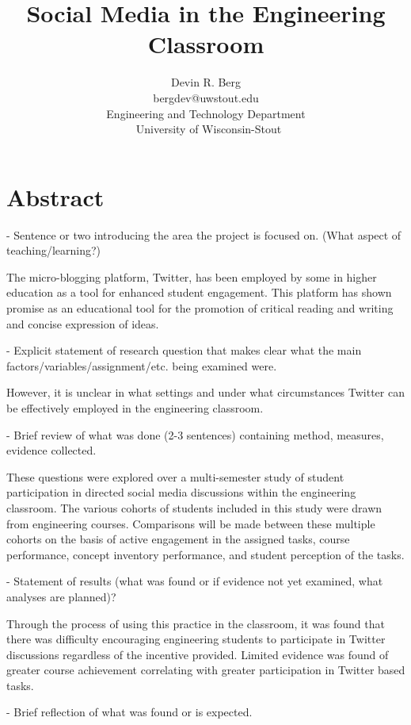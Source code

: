\documentclass[12pt]{article}
\title{\large \textbf{Social Media in the Engineering Classroom}} %
\author{\vspace{-5ex}}
\author{\normalsize Devin R. Berg\\
\normalsize bergdev@uwstout.edu\\
\normalsize Engineering and Technology Department\\\
\normalsize University of Wisconsin-Stout}
\date{\vspace{-5ex}} %
\begin{document}
\raggedright
\maketitle
\thispagestyle{empty}
\pagestyle{empty}

\section*{Abstract}
- Sentence or two introducing the area the project is focused on. (What aspect of teaching/learning?)

The micro-blogging platform, Twitter, has been employed by some in higher education as a tool for enhanced student engagement. This platform has shown promise as an educational tool for the promotion of critical reading and writing and concise expression of ideas.

- Explicit statement of research question that makes clear what the main factors/variables/assignment/etc. being examined were.

However, it is unclear in what settings and under what circumstances Twitter can be effectively employed in the engineering classroom.

- Brief review of what was done (2-3 sentences) containing method, measures, evidence collected.

These questions were explored over a multi-semester study of student participation in directed social media discussions within the engineering classroom. The various cohorts of students included in this study were drawn from engineering courses. Comparisons will be made between these multiple cohorts on the basis of active engagement in the assigned tasks, course performance, concept inventory performance, and student perception of the tasks.

- Statement of results (what was found or if evidence not yet examined, what analyses are planned)?

Through the process of using this practice in the classroom, it was found that there was difficulty encouraging engineering students to participate in Twitter discussions regardless of the incentive provided. Limited evidence was found of greater course achievement correlating with greater participation in Twitter based tasks.

- Brief reflection of what was found or is expected.
\end{document}

